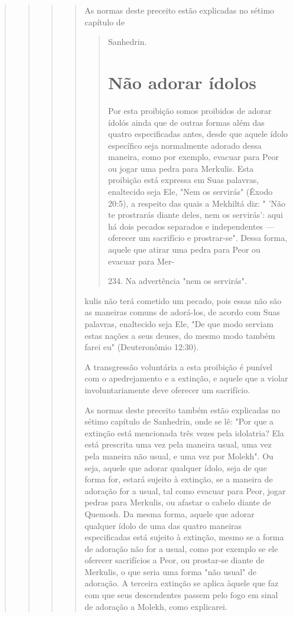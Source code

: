 \begin{quote}
\begin{quote}
\begin{quote}
\begin{quote}
As normas deste preceito estão explicadas no sétimo capítulo de

\begin{quote}
Sanhedrin.

\section{Não adorar ídolos}

Por esta proibição somos proibidos de adorar ídolós ainda que de outras
formas além das quatro especificadas antes, desde que aquele ídolo
es­pecífico seja normalmente adorado dessa maneira, como por exemplo,
evacuar para Peor ou jogar uma pedra para Merkulis. Esta proibição está
expressa em Suas palavras, enaltecido seja Ele, "Nem os servirás" (Êxodo
20:5), a respeito das quais a Mekhiltá diz: " 'Não te prostrarás diante
deles, nem os servirás': aqui há dois pecados separados e independentes
--- oferecer um sacrifício e prostrar-se". Dessa forma, aquele que
atirar uma pedra para Peor ou evacuar para Mer-

234. Na advertência "nem os servirás".
\end{quote}

kulis não terá cometido um pecado, pois essas não são as maneiras comuns
de adorá-los, de acordo com Suas palavras, enaltecido seja Ele, "De que
modo ser­viam estas nações a seus deuses, do mesmo modo também farei eu"
(Deutero­nômio 12:30).

A transgressão voluntária a esta proibição é punível com o
apedreja­mento e a extinção, e aquele que a violar involuntariamente
deve oferecer um sacrifício.

As normas deste preceito também estão explicadas no sétimo capí­tulo de
Sanhedrin, onde se lê: "Por que a extinção está mencionada três vezes
pela idolatria? Ela está prescrita uma vez pela maneira usual, uma vez
pela ma­neira não usual, e uma vez por Molekh". Ou seja, aquele que
adorar qualquer ídolo, seja de que forma for, estará sujeito à extinção,
se a maneira de adoração for a usual, tal como evacuar para Peor, jogar
pedras para Merkulis, ou afastar o cabelo diante de Quemosh. Da mesma
forma, aquele que adorar qualquer ídolo de uma das quatro maneiras
especificadas está sujeito à extinção, mesmo se a forma de adoração não
for a usual, como por exemplo se ele oferecer sacri­fícios a Peor, ou
prostar-se diante de Merkulis, o que seria uma forma "não usual" de
adoração. A terceira extinção se aplica àquele que faz com que seus
descen­dentes passem pelo fogo em sinal de adoração a Molekh, como
explicarei.


\end{quote}
\end{quote}
\end{quote}
\end{quote}
